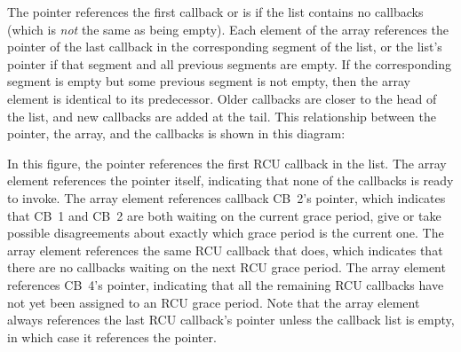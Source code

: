 The  pointer references the first callback or is  if
the list contains no callbacks (which is \emph{not} the same as being empty).
Each element of the  array references the 
pointer of the last callback in the corresponding segment of the list,
or the list's  pointer if that segment and all previous
segments are empty.
If the corresponding segment is empty but some
previous segment is not empty, then the array element is identical to
its predecessor.
Older callbacks are closer to the head of the list, and
new callbacks are added at the tail.
This relationship between the
 pointer, the  array, and the callbacks is shown
in this diagram:

\begin{center}
\end{center}

In this figure, the  pointer references the first RCU callback
in the list.
The  array element references the
 pointer itself, indicating that none of the callbacks is
ready to invoke.
The  array element references
callback CB~2's  pointer, which indicates that CB~1 and CB~2
are both waiting on the current grace period, give or take possible
disagreements about exactly which grace period is the current one.
The
 array element references the same RCU
callback that  does, which indicates that
there are no callbacks waiting on the next RCU grace period.
The
 array element references CB~4's 
pointer, indicating that all the remaining RCU callbacks have not yet
been assigned to an RCU grace period.
Note that the
 array element always references the last RCU
callback's  pointer unless the callback list is empty, in
which case it references the  pointer.

